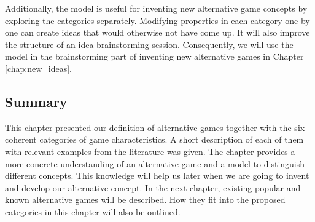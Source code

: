 Additionally, the model is useful for inventing new alternative game concepts by exploring the categories separately. Modifying properties in each category one by one can create ideas that would otherwise not have come up. It will also improve the structure of an idea brainstorming session. Consequently, we will use the model in the brainstorming part of inventing new alternative games in Chapter \ref{chap:new_ideas}.

\subsection{Summary}
This chapter presented our definition of alternative games together with the six coherent categories of game characteristics. A short description of each of them with relevant examples from the literature was given. The chapter provides a more concrete understanding of an alternative game and a model to distinguish different concepts. This knowledge will help us later when we are going to invent and develop our alternative concept. In the next chapter, existing popular and known alternative games will be described. How they fit into the proposed categories in this chapter will also be outlined.